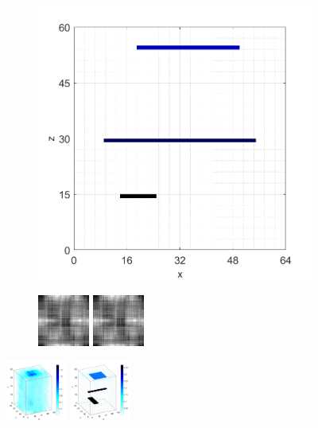 \documentclass[9pt,twocolumn,twoside]{osajnl}
\begin{document}
\begin{figure}[htbp]
\begin{minipage}[b]{1\textwidth}
\begin{subfigure}[b]{0.18\textwidth}
  \includegraphics[width=0.45\columnwidth]{overlap_side}
\end{subfigure}
\begin{subfigure}[b]{0.18\textwidth}
  \centering
  \includegraphics[width=0.45\columnwidth]{overlap_complex_holo}

  \includegraphics[width=0.45\columnwidth]{overlap_complex_holo}
\end{subfigure}
\includegraphics[width=0.18\textwidth]{overlap_complex_BP_3d}
\includegraphics[width=0.18\textwidth]{overlap_complex_TwIST_3d}
\subcaption{}
\end{minipage}


\end{figure}
\end{document}
